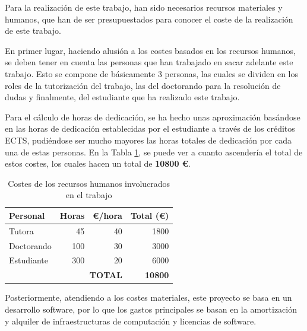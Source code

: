 Para la realización de este trabajo, han sido necesarios recursos materiales y humanos, que han de ser presupuestados para conocer el coste de la realización de este trabajo.

En primer lugar, haciendo alusión a los costes basados en los recursos humanos, se deben tener en cuenta las personas que han trabajado en sacar adelante este trabajo. Esto se compone de básicamente 3 personas, las cuales se dividen en los roles de la tutorización del trabajo, las del doctorando para la resolución de dudas y finalmente, del estudiante que ha realizado este trabajo.

Para el cálculo de horas de dedicación, se ha hecho unas aproximación basándose en las horas de dedicación establecidas por el estudiante a través de los créditos ECTS, pudiéndose ser mucho mayores las horas totales de dedicación por cada una de estas personas. En la Tabla \ref{tab:costes_humanos}, se puede ver a cuanto ascendería el total de estos costes, los cuales hacen un total de \textbf{10800 €}.

\begin{table}[h]
\caption{Costes de los recursos humanos involucrados en el trabajo}
\label{tab:costes_humanos}
\centering
\begin{tabular}{l|r|r|r}
\toprule
\textbf{Personal} & \multicolumn{1}{l|}{\textbf{Horas}} & \multicolumn{1}{l|}{\textbf{€/hora}} & \multicolumn{1}{l}{\textbf{Total (€)}} \\ \hline
Tutora            & 45                                  & 40                                   & 1800                                   \\
Doctorando        & 100                                 & 30                                   & 3000                                   \\
Estudiante        & 300                                 & 20                                   & 6000                                   \\ \hline
\multicolumn{3}{r|}{\textbf{TOTAL}}                                                            & \textbf{10800} \\
\bottomrule
\end{tabular}
\end{table}

Posteriormente, atendiendo a los costes materiales, este proyecto se basa en un desarrollo software, por lo que los gastos principales se basan en la amortización y alquiler de infraestructuras de computación y licencias de software. 

